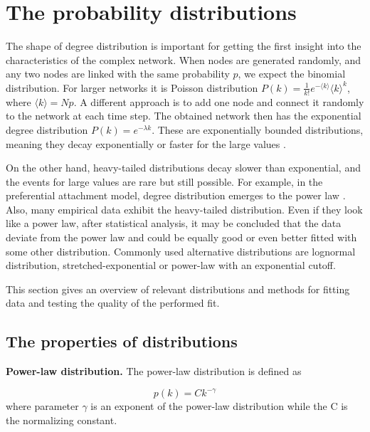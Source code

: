 \section{The probability distributions}

The shape of degree distribution is important for getting the first insight into the characteristics of the complex network. When nodes are generated randomly, and any two nodes are linked with the same probability $p$,  we expect the binomial distribution. For larger networks it is Poisson distribution $P(k) = \frac{1}{k!}e^{-\langle k \rangle}\langle k \rangle^{k}$, where $\langle k \rangle = Np$. A different approach is to add one node and connect it randomly to the network at each time step. The obtained network then has the exponential degree distribution $P(k)=e^{-\lambda k}$. These are exponentially bounded distributions, meaning they decay exponentially or faster for the large values \cite{barabasi2016network}. 

On the other hand, heavy-tailed distributions decay slower than exponential, and the events for large values are rare but still possible. For example, in the preferential attachment model, degree distribution emerges to the power law \cite{barabasi2016network}. Also, many empirical data exhibit the heavy-tailed distribution. Even if they look like a power law, after statistical analysis, it may be concluded that the data deviate from the power law and could be equally good or even better fitted with some other distribution. Commonly used alternative distributions are lognormal distribution, stretched-exponential or power-law with an exponential cutoff. 

This section gives an overview of relevant distributions and methods for fitting data and testing the quality of the performed fit. 


\subsection{The properties of distributions}

\textbf{Power-law distribution.} The power-law distribution \cite{mitzenmacher2004brief, newman2005power} is defined as 

\begin{equation}
p(k) = C k^{-\gamma}
\end{equation}
where parameter $\gamma$ is an exponent of the power-law distribution while the C is the normalizing constant. 

